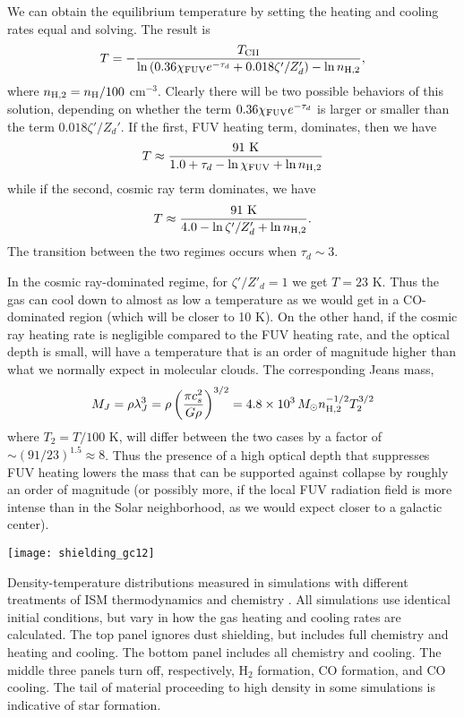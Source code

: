 We can obtain the equilibrium temperature by setting the heating and cooling rates equal and solving. The result is
\begin{equation}
T = -\frac{T_{\rm CII}}{\ln \left( 0.36 \chi_{\rm FUV} e^{-\tau_d} + 0.018 \zeta'/Z'_d\right) - \ln n_{\rm H,2}},
\end{equation}
where $n_{\rm H,2} = n_{\rm H}/100$ cm$^{-3}$. Clearly there will be two possible behaviors of this solution, depending on whether the term $0.36 \chi_{\rm FUV} e^{-\tau_d}$ is larger or smaller than the term $0.018\zeta'/Z_d'$. If the first, FUV heating term, dominates, then we have
\begin{equation}
T \approx \frac{91\mbox{ K}}{1.0 + \tau_d - \ln \chi_{\rm FUV} + \ln n_{\rm H,2}}
\end{equation}
while if the second, cosmic ray term dominates, we have
\begin{equation}
T \approx \frac{91\mbox{ K}}{4.0 - \ln \zeta'/Z'_d + \ln n_{\rm H,2}}.
\end{equation}
The transition between the two regimes occurs when $\tau_d \sim 3$.

In the cosmic ray-dominated regime, for $\zeta'/Z'_d = 1$ we get $T = 23$ K. Thus the gas can cool down to almost as low a temperature as we would get in a CO-dominated region (which will be closer to 10 K). On the other hand, if the cosmic ray heating rate is negligible compared to the FUV heating rate, and the optical depth is small, will have a temperature that is an order of magnitude higher than what we normally expect in molecular clouds. The corresponding Jeans mass,
\begin{equation}
M_J = \rho \lambda_J^3 = \rho \left(\frac{\pi c_s^2}{G \rho}\right)^{3/2} = 4.8\times 10^3\,M_\odot n_{\rm H,2}^{-1/2} T_2^{3/2}
\end{equation}
where $T_2 = T/100$ K, will differ between the two cases by a factor of $\sim (91/23)^{1.5} \approx 8$. Thus the presence of a high optical depth that suppresses FUV heating lowers the mass that can be supported against collapse by roughly an order of magnitude (or possibly more, if the local FUV radiation field is more intense than in the Solar neighborhood, as we would expect closer to a galactic center).

\begin{marginfigure}
\texttt{[image: shielding\_gc12]}
\caption[Density-temperature distribution for different cooling models]{
\label{fig:shielding_gc12}
Density-temperature distributions measured in simulations with different treatments of ISM thermodynamics and chemistry \citep{glover12a}. All simulations use identical initial conditions, but vary in how the gas heating and cooling rates are calculated. The top panel ignores dust shielding, but includes full chemistry and heating and cooling. The bottom panel includes all chemistry and cooling. The middle three panels turn off, respectively, H$_2$ formation, CO formation, and CO cooling. The tail of material proceeding to high density in some simulations is indicative of star formation.
}
\end{marginfigure}

